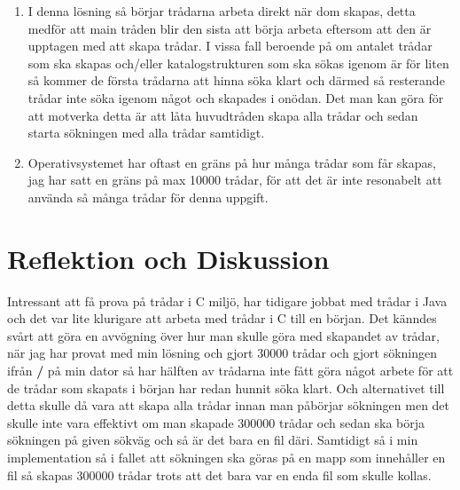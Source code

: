 \documentclass[11pt, titlepage, oneside, a4paper]{article}
\newcommand{\Section}[1]{\section{#1}\vspace{-8pt}}
\begin{document}
	\begin{enumerate}
	 \item I denna lösning så börjar trådarna arbeta direkt när dom skapas, detta medför att main tråden blir den sista att börja arbeta eftersom att den
	är upptagen med att skapa trådar. I vissa fall beroende på om antalet trådar som ska skapas och/eller katalogstrukturen som ska sökas igenom är för liten så kommer
	de första trådarna att hinna söka klart och därmed så resterande trådar inte söka igenom något och skapades i onödan.
	Det man kan göra för att motverka detta är att låta huvudtråden skapa alla trådar och sedan starta sökningen med alla trådar samtidigt.
	
	\item Operativsystemet har oftast en gräns på hur många trådar som får skapas, jag har satt en gräns på max 10000 trådar, för att det är inte resonabelt att använda så många trådar för denna uppgift.
	\end{enumerate}
 	
 	\Section{Reflektion och Diskussion}
 	Intressant att få prova på trådar i C miljö, har tidigare jobbat med trådar i Java och det var lite klurigare att arbeta med trådar i C till en början.
 	Det känndes svårt att göra en avvögning över hur man skulle göra med skapandet av trådar, när jag har provat med min lösning och gjort 30000 trådar och gjort sökningen ifrån \textbf{/} 
 	på min dator så har hälften av trådarna inte fått göra något arbete för att de trådar som skapats i början har redan hunnit söka klart. Och alternativet till detta skulle då vara att skapa 
 	alla trådar innan man påbörjar sökningen men det skulle inte vara effektivt om man skapade 300000 trådar och sedan ska börja sökningen på given sökväg och så är det bara en fil däri.
 	Samtidigt så i min implementation så i fallet att sökningen ska göras på en mapp som innehåller en fil så skapas 300000 trådar trots att det bara var en enda fil som skulle kollas.
 	
	
\end{document}
